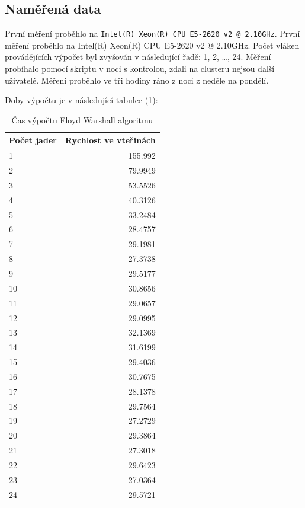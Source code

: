 \documentclass[a4paper,10pt]{article}
\begin{document}
\subsection{Naměřená data}

První měření proběhlo na \texttt{Intel(R) Xeon(R) CPU E5-2620 v2 @ 2.10GHz}. První měření proběhlo na Intel(R) Xeon(R) CPU E5-2620 v2 @ 2.10GHz. Počet vláken provádějících výpočet byl zvyšován v následující řadě: 1, 2, \dots , 24. Měření probíhalo pomocí skriptu v noci s kontrolou, zdali na clusteru nejsou další uživatelé. Měření proběhlo ve tři hodiny ráno z noci z neděle na pondělí.

Doby výpočtu je v následující tabulce (\ref{tab:xnfl}):

\begin{table}[H]
  \centering
	\caption{Čas výpočtu Floyd Warshall algoritmu}
	\begin{tabular}{| l | r |}
\hline
Počet jader & Rychlost ve vteřinách \\ \hline
1 & 155.992 \\ \hline
2 & 79.9949 \\ \hline
3 & 53.5526 \\ \hline
4 & 40.3126 \\ \hline
5 & 33.2484 \\ \hline
6 & 28.4757 \\ \hline
7 & 29.1981 \\ \hline
8 & 27.3738 \\ \hline
9 & 29.5177 \\ \hline
10 & 30.8656 \\ \hline
11 & 29.0657 \\ \hline
12 & 29.0995 \\ \hline
13 & 32.1369 \\ \hline
14 & 31.6199 \\ \hline
15 & 29.4036 \\ \hline
16 & 30.7675 \\ \hline
17 & 28.1378 \\ \hline
18 & 29.7564 \\ \hline
19 & 27.2729 \\ \hline
20 & 29.3864 \\ \hline
21 & 27.3018 \\ \hline
22 & 29.6423 \\ \hline
23 & 27.0364 \\ \hline
24 & 29.5721 \\ \hline
	\end{tabular}
  \label{tab:xnfl}
\end{table}
\end{document}
